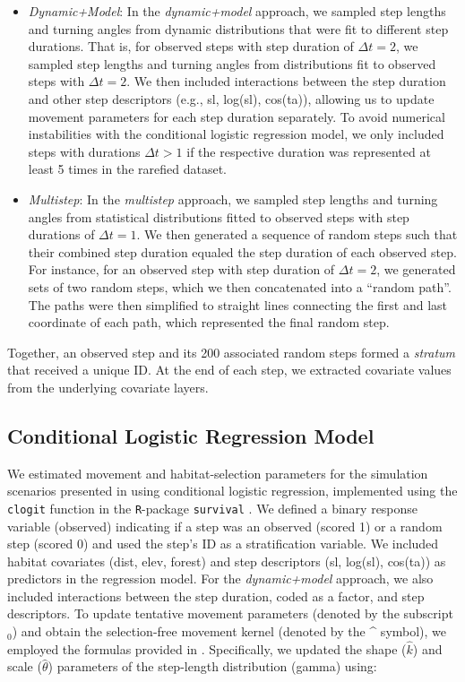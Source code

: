 \documentclass[abstract=on,10pt,a4paper,bibliography=totocnumbered]{article}
\begin{document}
\begin{itemize}
  \item \textit{Dynamic+Model}: In the \textit{dynamic+model} approach, we
  sampled step lengths and turning angles from dynamic distributions that were
  fit to different step durations. That is, for observed steps with
  step duration of $\Delta t = 2$, we sampled step lengths and turning angles
  from distributions fit to observed steps with $\Delta t = 2$. We then included
  interactions between the step duration and other step descriptors (e.g., sl,
  log(sl), cos(ta)), allowing us to update movement parameters for each
  step duration separately. To avoid numerical instabilities with the
  conditional logistic regression model, we only included steps with durations
  $\Delta t > 1$ if the respective duration was represented at least 5 times in
  the rarefied dataset.

  \item \textit{Multistep}: In the \textit{multistep} approach, we sampled
  step lengths and turning angles from statistical distributions fitted to
  observed steps with step durations of $\Delta t = 1$. We then generated a
  sequence of random steps such that their combined step duration equaled the
  step duration of each observed step.  For instance, for an observed step with
  step duration of $\Delta t = 2$, we generated sets of two random steps, which
  we then concatenated into a ``random path''. The paths were then simplified to
  straight lines connecting the first and last coordinate of each path, which
  represented the final random step.

\end{itemize}

\noindent Together, an observed step and its 200 associated random steps formed
a \textit{stratum} that received a unique ID. At the end of each step, we
extracted covariate values from the underlying covariate layers.

\subsection{Conditional Logistic Regression Model}

We estimated movement and habitat-selection parameters for the simulation
scenarios presented in  using conditional logistic regression,
implemented using the \texttt{clogit} function in the \texttt{R}-package
\texttt{survival} \citep{Therneau.2023}. We defined a binary response variable
(\textsf{observed}) indicating if a step was an observed (scored 1) or a random
step (scored 0) and used the step's ID as a stratification variable. We included
habitat covariates (dist, elev, forest) and step descriptors (sl, log(sl),
cos(ta)) as predictors in the regression model. For the \textit{dynamic+model}
approach, we also included interactions between the step duration, coded as a
factor, and step descriptors. To update tentative movement parameters (denoted
by the subscript $_0$) and obtain the selection-free movement kernel (denoted by
the \string^ symbol), we employed the formulas provided in \citep{Avgar.2016,
Fieberg.2021}. Specifically, we updated the shape ($\hat{k}$) and scale
($\hat{\theta}$) parameters of the step-length distribution (gamma) using:
\end{document}
